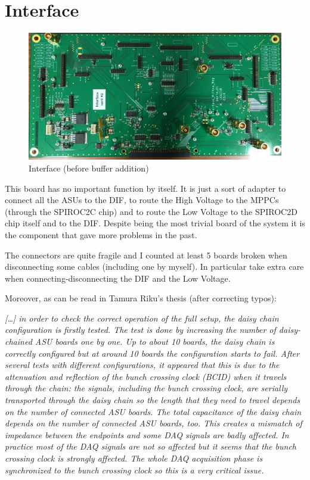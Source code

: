   
\section{Interface}
\begin{figure}[H]
  \centering
    \includegraphics[width=0.8\linewidth, frame]{Interface}
    \caption{Interface (before buffer addition)}
  \end{figure}
This board has no important function by itself. It is just a sort of
adapter to connect all the ASUs to the DIF, to route the High Voltage
to the MPPCs (through the SPIROC2C chip) and to route the Low Voltage
to the SPIROC2D chip itself and to the DIF. Despite being the most
trivial board of the system it is the component that gave more problems
in the past.

The connectors are quite fragile and I counted at least 5 boards
broken when disconnecting some cables (including one by myself). In
particular take extra care when connecting-disconnecting the DIF and
the Low Voltage.

Moreover, as can be read in Tamura Riku's thesis (after correcting typos):

\textit{[\dots] in order to check the correct operation of
  the full setup, the daisy chain configuration is firstly tested. The
  test is done by increasing the number of daisy-chained ASU boards
  one by one. Up to about 10 boards, the daisy chain is correctly
  configured but at around 10 boards the configuration starts to
  fail. After several tests with different configurations, it appeared
  that this is due to the attenuation and reflection of the bunch
  crossing clock (BCID) when it travels through the chain: the
  signals, including the bunch crossing clock, are serially
  transported through the daisy chain so the length that they need to
  travel depends on the number of connected ASU boards. The total
  capacitance of the daisy chain depends on the number of connected
  ASU boards, too. This creates a mismatch of impedance between the
  endpoints and some DAQ signals are badly affected. In practice most
  of the DAQ signals are not so affected but it seems that the bunch
  crossing clock is strongly affected. The whole DAQ acquisition phase
  is synchronized to the bunch crossing clock so this is a very
  critical issue.}

